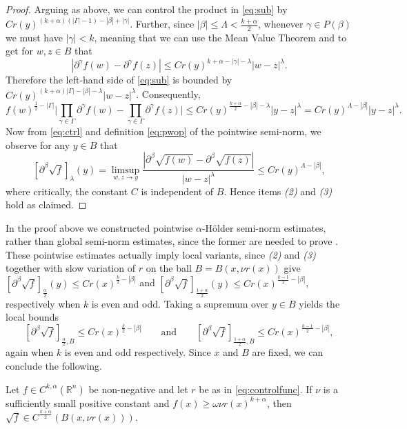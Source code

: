 \documentclass[oneside,hidelinks,indentfirst,10pt]{book}
\begin{document}
\begin{proof}
Arguing as above, we can control the product in \eqref{eq:sub} by \(Cr(y)^{(k+\alpha)(|\Gamma|-1)-|\beta|+|\gamma|}\). Further, since \(|\beta|\leq\Lambda< \frac{k+\alpha}{2}\), whenever \(\gamma\in P(\beta)\) we must have \(|\gamma|<k\), meaning that we can use the Mean Value Theorem and  to get for \(w,z\in B\) that
\[
    |\partial^\gamma f(w)-\partial^\gamma f(z)|\leq Cr(y)^{k+\alpha-|\gamma|-\lambda}|w-z|^\lambda.
\]
Therefore the left-hand side of \eqref{eq:sub} is bounded by \(Cr(y)^{(k+\alpha)|\Gamma|-|\beta|-\lambda}|w-z|^\lambda\). Consequently,
\[
    f(w)^{\frac{1}{2}-|\Gamma|}\bigg|\prod_{\gamma\in\Gamma}\partial^\gamma f(w)-\prod_{\gamma\in\Gamma}\partial^\gamma f(z)\bigg|\leq Cr(y)^{\frac{k+\alpha}{2}-|\beta|-\lambda}|y-z|^\lambda=Cr(y)^{\Lambda-|\beta|}|y-z|^\lambda.
\]
Now from \eqref{eq:ctrl} and definition \eqref{eq:pwop} of the pointwise semi-norm, we observe for any \(y\in B\) that
\[
    [\partial^\beta\sqrt{f}]_\lambda(y)=\limsup_{w,z\rightarrow y}\frac{|\partial^\beta\sqrt{f(w)}-\partial^\beta\sqrt{f(z)}|}{|w-z|^\lambda}\leq Cr(y)^{\Lambda-|\beta|},
\]
where critically, the constant \(C\) is independent of \(B\). Hence items \textit{(2)} and \textit{(3)} hold as claimed.
\end{proof}


In the proof above we constructed pointwise \(\alpha\)-H\"older semi-norm estimates, rather than global semi-norm estimates, since the former are needed to prove . These pointwise estimates actually imply local variants, since \textit{(2)} and \textit{(3)} together with slow variation of \(r\) on the ball \(B=B(x,\nu r(x))\) give \([\partial^\beta\sqrt{f}]_{\frac{\alpha}{2}}(y)\leq Cr(x)^{\frac{k}{2}-|\beta|}\) and \([\partial^\beta\sqrt{f}]_{\frac{1+\alpha}{2}}(y)\leq Cr(x)^{\frac{k-1}{2}-|\beta|}\), respectively when \(k\) is even and odd. Taking a supremum over \(y\in B\) yields the local bounds
\[
    [\partial^\beta\sqrt{f}]_{\frac{\alpha}{2},B}\leq Cr(x)^{\frac{k}{2}-|\beta|}\qquad\mathrm{and}\qquad[\partial^\beta\sqrt{f}]_{\frac{1+\alpha}{2},B}\leq Cr(x)^{\frac{k-1}{2}-|\beta|},
\]
again when \(k\) is even and odd respectively. Since \(x\) and \(B\) are fixed, we can conclude the following.


\begin{cor}
Let \(f\in C^{k,\alpha}(\mathbb{R}^n)\) be non-negative and let \(r\) be as in \eqref{eq:controlfunc}. If \(\nu\) is a sufficiently small positive constant and \(f(x)\geq \omega\nu r(x)^{k+\alpha}\), then \(\sqrt{f}\in C^\frac{k+\alpha}{2}(B(x,\nu r(x)))\).
\end{cor}
\end{document}
